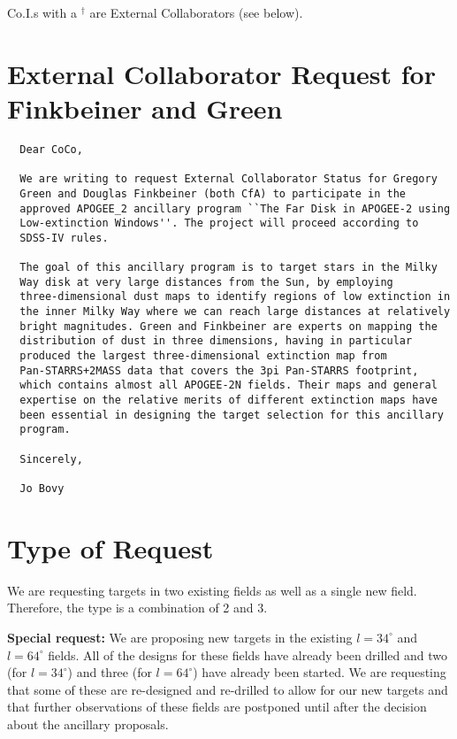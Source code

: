 \documentclass[12pt,preprint]{aastex}
\begin{document}
Co.I.s with a $^\dagger$ are External Collaborators (see below).

\section{External Collaborator Request for Finkbeiner and Green}

\begin{verbatim}
  Dear CoCo,

  We are writing to request External Collaborator Status for Gregory
  Green and Douglas Finkbeiner (both CfA) to participate in the
  approved APOGEE_2 ancillary program ``The Far Disk in APOGEE-2 using
  Low-extinction Windows''. The project will proceed according to
  SDSS-IV rules.

  The goal of this ancillary program is to target stars in the Milky
  Way disk at very large distances from the Sun, by employing
  three-dimensional dust maps to identify regions of low extinction in
  the inner Milky Way where we can reach large distances at relatively
  bright magnitudes. Green and Finkbeiner are experts on mapping the
  distribution of dust in three dimensions, having in particular
  produced the largest three-dimensional extinction map from
  Pan-STARRS+2MASS data that covers the 3pi Pan-STARRS footprint,
  which contains almost all APOGEE-2N fields. Their maps and general
  expertise on the relative merits of different extinction maps have
  been essential in designing the target selection for this ancillary
  program.

  Sincerely,

  Jo Bovy
\end{verbatim}

\section{Type of Request}

We are requesting targets in two existing fields as well as a single
new field. Therefore, the type is a combination of 2 and 3.

{\bf Special request:} We are proposing new targets in the existing
$l=34^\circ$ and $l=64^\circ$ fields. All of the designs for these
fields have already been drilled and two (for $l=34^\circ$) and three
(for $l=64^\circ$) have already been started. We are requesting that
some of these are re-designed and re-drilled to allow for our new
targets and that further observations of these fields are postponed
until after the decision about the ancillary proposals.
\end{document}
